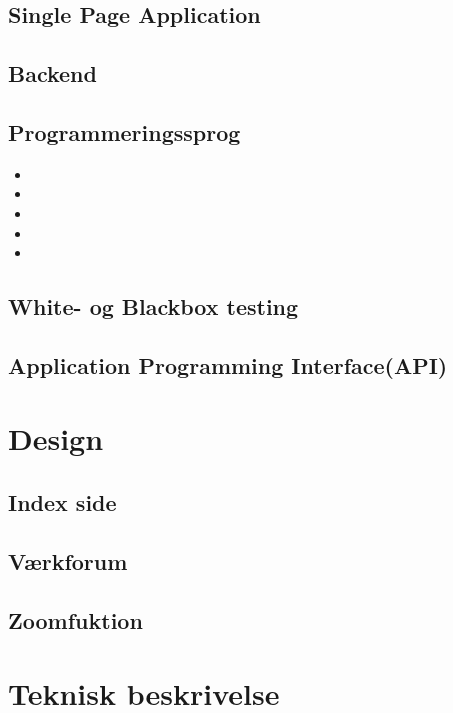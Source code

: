 \documentclass[final]{rapport1}
\begin{document}
\subsection{Single Page Application}

\subsection{Backend}

\subsection{Programmeringssprog}
\begin{itemize}
\item 
\item 
\item 
\item 
\item 
\end{itemize}

\subsection{White- og Blackbox testing}

\subsection{Application Programming Interface(API)}
\clearpage
\section{Design}

\subsection{Index side}

\subsection{Værkforum}



\subsection{Zoomfuktion}


\section{Teknisk beskrivelse}
\end{document}
